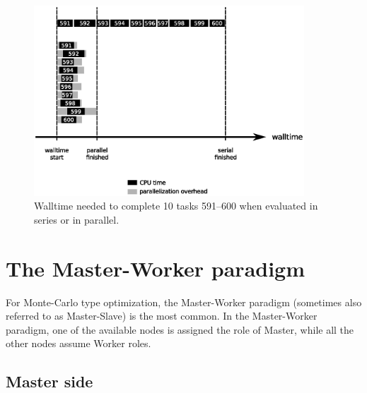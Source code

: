 \begin{figure}[htb]
  \centering
    \includegraphics[width=0.9\textwidth]{./../eps/serial-parallel-walltime.eps}
  \caption{Walltime needed to complete 10 tasks 591--600 when evaluated in series or in parallel.}
  \label{fig:walltime-comparison}
\end{figure}



\section{The Master-Worker paradigm}


For Monte-Carlo type optimization, the Master-Worker paradigm (sometimes also referred to as Master-Slave) is the most common. In the Master-Worker paradigm, one of the available nodes is assigned the role of Master, while all the other nodes assume Worker roles.

\subsection{Master side}

